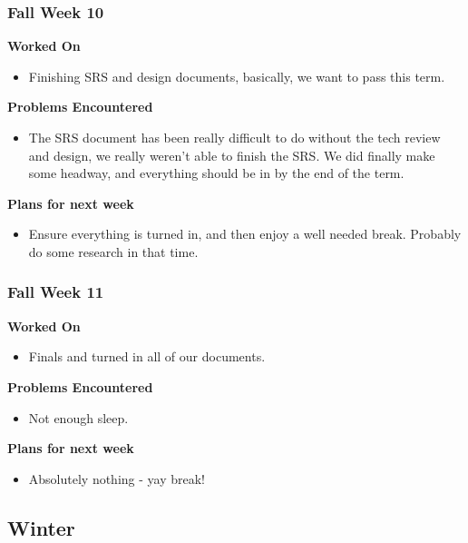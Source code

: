 \documentclass[compsoc,draftclsnofoot,onecolumn,10pt]{IEEEtran}
\begin{document}
\subsubsection*{Fall Week 10}
\textbf{Worked On}
\begin{itemize}
    \item Finishing SRS and design documents, basically, we want to pass this term.
\end{itemize}
\textbf{Problems Encountered}
\begin{itemize}
    \item The SRS document has been really difficult to do without the tech review and design, we really weren't able to finish the SRS. We did finally make some headway, and everything should be in by the end of the term. 
\end{itemize}
\textbf{Plans for next week}
\begin{itemize}
    \item Ensure everything is turned in, and then enjoy a well needed break. Probably do some research in that time. 
\end{itemize}



\subsubsection*{Fall Week 11}
\textbf{Worked On}
\begin{itemize}
    \item Finals and turned in all of our documents. 
\end{itemize}
\textbf{Problems Encountered}
\begin{itemize}
    \item Not enough sleep.
\end{itemize}
\textbf{Plans for next week}
\begin{itemize}
    \item Absolutely nothing - yay break!
\end{itemize}


\subsection{Winter}
\end{document}
